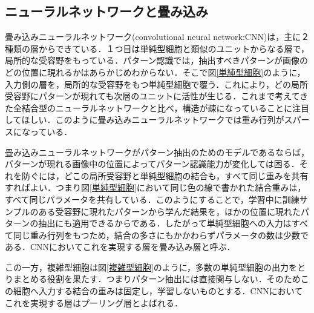 \documentclass[a4paper,11pt]{jsreport}
\begin{document}
\subsection{ニューラルネットワークと畳み込み}
畳み込みニューラルネットワーク(convolutional neural network:CNN)は，主に２種類の層からできている．１つ目は単純型細胞と類似のユニットからなる層で，局所的な受容野をもっている．パターン認識では，抽出すべきパターンが画像のどの位置に現れるかはあらかじめわからない．そこで図\ref{単純型細胞}のように，入力側の層を，局所的な受容野をもつ単純型細胞で覆う．これにより，どの局所受容野にパターンが現れても次層のユニットに活性が生じる．これまで考えてきた全結合型のニューラルネットワークと比べ，構造が疎になっていることに注目してほしい．このように畳み込みニューラルネットワークでは重み行列がスパースになっている．\par
畳み込みニューラルネットワークがパターン抽出のためのモデルであるならば，パターンが現れる画像中の位置によってパターン認識能力が変化しては困る．それを防ぐには，どこの局所受容野と単純型細胞の結合も，すべて同じ重みを共有すればよい．つまり図\ref{単純型細胞}において同じ色の線で書かれた結合重みは，すべて同じパラメータを共有している．このようにすることで，学習中に訓練サンプルのある受容野に現れたパターンから学んだ結果を，ほかの位置に現れたパターンの抽出にも適用できるからである．したがって単純型細胞への入力はすべて同じ重み行列をもつため，結合の多さにもかかわらずパラメータの数は少数である．CNNにおいてこれを実現する層を畳み込み層と呼ぶ．\par
この一方，複雑型細胞は図\ref{複雑型細胞}のように，多数の単純型細胞の出力をとりまとめる役割を果たす．つまりパターン抽出には直接関与しない．そのためこの細胞へ入力する結合の重みは固定し，学習しないものとする．CNNにおいてこれを実現する層はプーリング層とよばれる．
\end{document}
